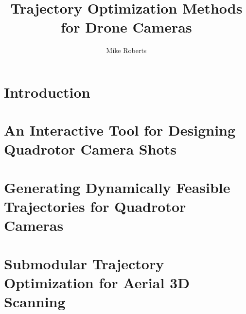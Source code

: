 \documentclass{report}
\begin{document}
\newcommand{\shortcite}[1]{\cite{#1}}

\title{Trajectory Optimization Methods for Drone Cameras}
\author{Mike Roberts}

\beforepreface




\afterpreface

\chapter{Introduction}



\chapter{An Interactive Tool for Designing Quadrotor Camera Shots}















\chapter{Generating Dynamically Feasible Trajectories for Quadrotor Cameras}










\chapter{Submodular Trajectory Optimization for Aerial 3D Scanning}
\end{document}
